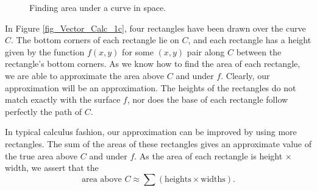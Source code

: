 \begin{figure}[t]
\centering
\qquad
{}
\qquad
{}
\caption{Finding area under a curve in space.}
\end{figure}


In Figure \ref{fig_Vector_Calc_1c}, four rectangles have been drawn over the curve $C$. The bottom corners of each rectangle lie on $C$, and each rectangle has a height given by the function $f(x,y)$ for some $(x,y)$ pair along $C$ between the rectangle's bottom corners. 
As we know how to find the area of each rectangle, we are able to approximate the area above $C$ and under $f$. Clearly, our approximation will be an approximation. The heights of the rectangles do not match exactly with the surface $f$, nor does the base of each rectangle follow perfectly the path of $C$.

In typical calculus fashion, our approximation can be improved by using more rectangles. The sum of the areas of these rectangles gives an approximate value of the true area above $C$ and under $f$. As the area of each rectangle is height $\times$ width, we assert that the
$$\text{area above $C$}\approx \sum (\text{heights}\times\text{widths}).$$

